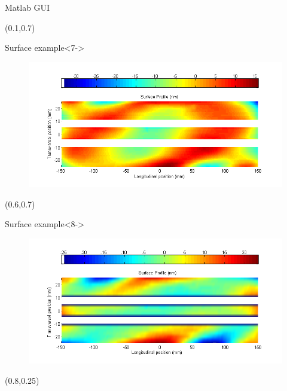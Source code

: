 \documentclass{beamer}
\begin{document}
\begin{frame}
\begin{textblock*}{45mm}
\begin{block}{Matlab GUI}
\begin{figure}
            \end{figure}
        \end{block}
    \end{textblock*}
    \begin{textblock*}{45mm}(0.1\textwidth,0.7\textheight)
        \begin{exampleblock}{Surface example}<7->
            \begin{figure}
                \includegraphics[width=\textwidth]{imgs/alba/laop/06_mirror_surface_example.png}
            \end{figure}
        \end{exampleblock}
    \end{textblock*}
    \begin{textblock*}{45mm}(0.6\textwidth,0.7\textheight)
        \begin{exampleblock}{Surface example}<8->
            \begin{figure}
                \includegraphics[width=\textwidth]{imgs/alba/laop/07_mirror_surface_example2.png}
            \end{figure}
        \end{exampleblock}
    \end{textblock*}
    \begin{textblock*}{35mm}(0.8\textwidth,0.25\textheight)

\end{textblock*}
\end{frame}
\end{document}
